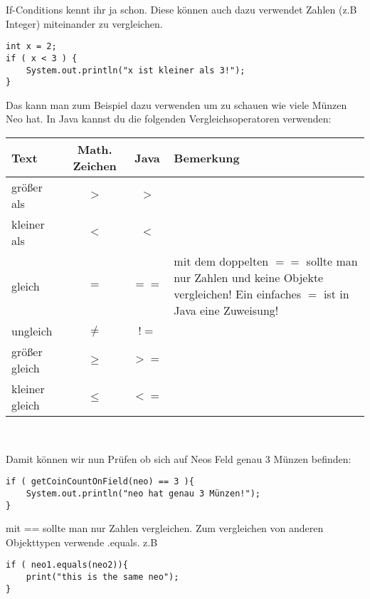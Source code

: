 \begin{Infobox}[If-Conditions 2]
If-Conditions kennt ihr ja schon. Diese können auch dazu verwendet Zahlen (z.B Integer) miteinander zu vergleichen.
\begin{lstlisting}
int x = 2;
if ( x < 3 ) {
	System.out.println("x ist kleiner als 3!");
}
\end{lstlisting}
Das kann man zum Beispiel dazu verwenden um zu schauen wie viele Münzen Neo hat. In Java kannst du die folgenden Vergleichsoperatoren verwenden:
\begin{center}
        \begin{tabular}{ l | c | c | l }
                Text & Math. Zeichen & Java & Bemerkung\\
            \hline
                  gr\"oßer als & $>$ & $>$ & \\
                  kleiner als & $<$ & $<$ & \\
                  gleich & $=$ & $==$ & \minibox{mit dem doppelten $==$ sollte man nur \\ Zahlen und keine Objekte vergleichen!\\ Ein einfaches $=$ ist in Java eine Zuweisung!}\\

                  ungleich & $\neq$ & $!=$ & \\
                  gr\"oßer gleich & $\geq$ & $>=$ &  \\

                  kleiner gleich & $\leq$ & $<=$ &  \\
        \end{tabular} \\
\end{center}

Damit können wir nun Prüfen ob sich auf Neos Feld genau 3 Münzen befinden:
\begin{lstlisting}
if ( getCoinCountOnField(neo) == 3 ){
	System.out.println("neo hat genau 3 Münzen!");
}
\end{lstlisting}
\end{Infobox}
\begin{Infobox}[== und .equals]
mit == sollte man nur Zahlen vergleichen. Zum vergleichen von anderen Objekttypen verwende .equals. z.B 
\begin{lstlisting}
if ( neo1.equals(neo2)){
	print("this is the same neo");
}
\end{lstlisting}

\end{Infobox}


